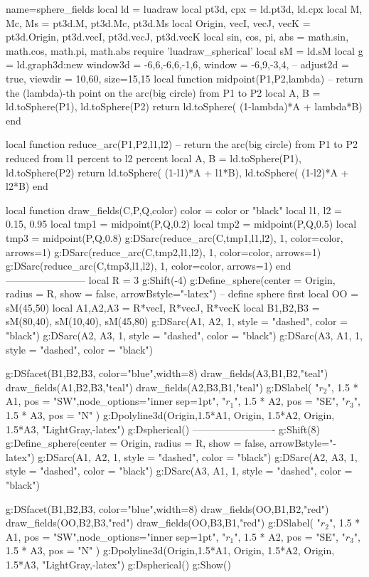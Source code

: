 \documentclass{standalone}
\begin{document}
\begin{luadraw}{name=sphere_fields}
local ld = luadraw
local pt3d, cpx = ld.pt3d, ld.cpx
local M, Mc, Ms = pt3d.M, pt3d.Mc, pt3d.Ms
local Origin, vecI, vecJ, vecK = pt3d.Origin, pt3d.vecI, pt3d.vecJ, pt3d.vecK
local sin, cos, pi, abs = math.sin, math.cos, math.pi, math.abs
require 'luadraw_spherical'
local sM = ld.sM
local g = ld.graph3d:new{
    window3d = {-6,6,-6,6,-1,6},
    window = {-6,9,-3,4},
    -- adjust2d = true,
    viewdir = {10,60},
    size={15,15}
}
local function midpoint(P1,P2,lambda)
    -- return the (lambda)-th point on the arc(big circle) from P1 to P2
    local A, B = ld.toSphere(P1), ld.toSphere(P2)
    return ld.toSphere( (1-lambda)*A + lambda*B)
end

local function reduce_arc(P1,P2,l1,l2)
    -- return the arc(big circle) from P1 to P2 reduced from l1 percent to l2 percent
    local A, B = ld.toSphere(P1), ld.toSphere(P2)
    return { ld.toSphere( (1-l1)*A + l1*B), ld.toSphere( (1-l2)*A + l2*B) }
end

local function draw_fields(C,P,Q,color)
    color = color or "black"
    local l1, l2 = 0.15, 0.95
    local tmp1 = midpoint(P,Q,0.2)
    local tmp2 = midpoint(P,Q,0.5)
    local tmp3 = midpoint(P,Q,0.8)
    g:DSarc(reduce_arc(C,tmp1,l1,l2), 1, {color=color, arrows=1})
    g:DSarc(reduce_arc(C,tmp2,l1,l2), 1, {color=color, arrows=1})
    g:DSarc(reduce_arc(C,tmp3,l1,l2), 1, {color=color, arrows=1})
end
------------------------
local R = 3
g:Shift(-4)
g:Define_sphere({center = Origin, radius = R, show = false, arrowBstyle="-latex"}) -- define sphere first
local OO = sM(45,50) 
local A1,A2,A3 = R*vecI, R*vecJ, R*vecK
local B1,B2,B3 = sM(80,40), sM(10,40), sM(45,80)
g:DSarc({A1, A2}, 1, {style = "dashed", color = "black"})
g:DSarc({A2, A3}, 1, {style = "dashed", color = "black"})
g:DSarc({A3, A1}, 1, {style = "dashed", color = "black"})

g:DSfacet({B1,B2,B3}, {color="blue",width=8})
draw_fields(A3,B1,B2,"teal")
draw_fields(A1,B2,B3,"teal")
draw_fields(A2,B3,B1,"teal")
g:DSlabel(
    "$r_2$", 1.5 * A1, {pos = "SW",node_options="inner sep=1pt"}, 
    "$r_1$", 1.5 * A2, {pos = "SE"}, 
    "$r_3$", 1.5 * A3, {pos = "N"}
)
g:Dpolyline3d({{Origin,1.5*A1}, {Origin, 1.5*A2}, {Origin, 1.5*A3}}, "LightGray,-latex")
g:Dspherical()
-------------------------
g:Shift(8)
g:Define_sphere({center = Origin, radius = R, show = false, arrowBstyle="-latex"})
g:DSarc({A1, A2}, 1, {style = "dashed", color = "black"})
g:DSarc({A2, A3}, 1, {style = "dashed", color = "black"})
g:DSarc({A3, A1}, 1, {style = "dashed", color = "black"})

g:DSfacet({B1,B2,B3}, {color="blue",width=8})
draw_fields(OO,B1,B2,"red")
draw_fields(OO,B2,B3,"red")
draw_fields(OO,B3,B1,"red")
g:DSlabel(
    "$r_2$", 1.5 * A1, {pos = "SW",node_options="inner sep=1pt"}, 
    "$r_1$", 1.5 * A2, {pos = "SE"}, 
    "$r_3$", 1.5 * A3, {pos = "N"}
)
g:Dpolyline3d({{Origin,1.5*A1}, {Origin, 1.5*A2}, {Origin, 1.5*A3}}, "LightGray,-latex")
g:Dspherical()
g:Show()
\end{luadraw}
\end{document}
